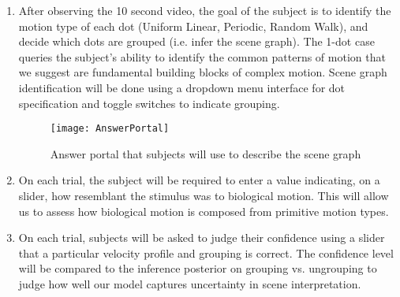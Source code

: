 \documentclass{scrartcl}
\begin{document}
\begin{enumerate}
  \item After observing the 10 second video, the goal of the subject is to identify the motion type of each dot (Uniform Linear, Periodic, Random Walk), and decide which dots are grouped (i.e. infer the scene graph). The 1-dot case queries the subject's ability to identify the common patterns of motion that we suggest are fundamental building blocks of complex motion. Scene graph identification will be done using a dropdown menu interface for dot specification and toggle switches to indicate grouping.

\begin{figure}[h]
    \centering
    \texttt{[image: AnswerPortal]}
    \caption{Answer portal that subjects will use to describe the scene graph}
    \label{fig:answerportal}
\end{figure}

  \item On each trial, the subject will be required to enter a value indicating, on a slider, how resemblant the stimulus was to biological motion. This will allow us to assess how biological motion is composed from primitive motion types. 
  \item On each trial, subjects will be asked to judge their confidence using a slider that a particular velocity profile and grouping is correct. The confidence level will be compared to the inference posterior on grouping vs. ungrouping to judge how well our model captures uncertainty in scene interpretation. 
\end{enumerate}
\end{document}
